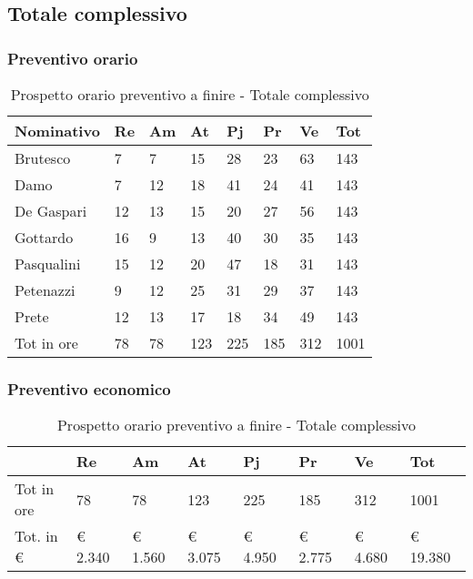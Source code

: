 	\newpage
	\subsection{Totale complessivo}
		\subsubsection{Preventivo orario}

			\begin{table}[H] \begin{center} \begin{tabular}{llllllll}
			\toprule
			\textbf{Nominativo}	&	\textbf{Re}	&	\textbf{Am}	&	\textbf{At}	&	\textbf{Pj}	&	\textbf{Pr}	&	\textbf{Ve}	&	\textbf{Tot}	 \\
			\midrule
			Brutesco	&	7	&	7	&	15	&	28	&	23	&	63	&	143	 \\
			Damo	&	7	&	12	&	18	&	41	&	24	&	41	&	143	 \\
			De Gaspari	&	12	&	13	&	15	&	20	&	27	&	56	&	143	 \\
			Gottardo	&	16	&	9	&	13	&	40	&	30	&	35	&	143	 \\
			Pasqualini	&	15	&	12	&	20	&	47	&	18	&	31	&	143	 \\
			Petenazzi	&	9	&	12	&	25	&	31	&	29	&	37	&	143	 \\
			Prete	&	12	&	13	&	17	&	18	&	34	&	49	&	143	 \\
			\midrule
			Tot in ore	&	78	&	78	&	123	&	225	&	185	&	312	&	1001	 \\


			\bottomrule
			\end{tabular} \end{center} \caption{Prospetto orario preventivo a finire -
			Totale complessivo
			} \end{table}
		\subsubsection{Preventivo economico}

	\begin{table}[H] \begin{center} \begin{tabular}{llllllll}
	\toprule
		&	\textbf{Re}	&	\textbf{Am}	&	\textbf{At}	&	\textbf{Pj}	&	\textbf{Pr}	&	\textbf{Ve}	&	\textbf{Tot}	 \\
	\midrule
	Tot in ore	&	78	&	78	&	123	&	225	&	185	&	312	&	1001	 \\


	Tot. in €	&	 €        2.340 	 & 	 €     1.560 	 & 	 €        3.075 	 & 	 €     4.950 	 & 	 €        2.775 	 & 	 €     4.680 	 & 	 €           19.380 		\\
	\bottomrule
	\end{tabular} \end{center} \caption{Prospetto orario preventivo a finire -
	Totale complessivo} \end{table}


